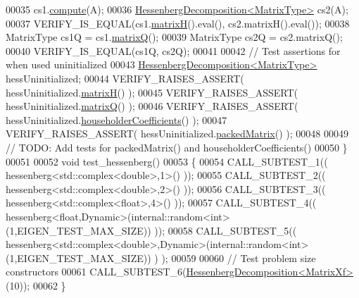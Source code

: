 \begin{DoxyCode}
00035   cs1.\hyperlink{group___eigenvalues___module_a239a6fd42c57aab3c0b048c47fde3004}{compute}(A);
00036   \hyperlink{group___eigenvalues___module}{HessenbergDecomposition<MatrixType>} cs2(A);
00037   VERIFY\_IS\_EQUAL(cs1.\hyperlink{group___eigenvalues___module_a8e781d2e22a2304647bcf0ae913cc8ea}{matrixH}().eval(), cs2.matrixH().eval());
00038   MatrixType cs1Q = cs1.\hyperlink{group___eigenvalues___module_a346441e4902a58d43d698ac3da6ff791}{matrixQ}();
00039   MatrixType cs2Q = cs2.matrixQ();  
00040   VERIFY\_IS\_EQUAL(cs1Q, cs2Q);
00041 
00042   \textcolor{comment}{// Test assertions for when used uninitialized}
00043   \hyperlink{group___eigenvalues___module}{HessenbergDecomposition<MatrixType>} hessUninitialized;
00044   VERIFY\_RAISES\_ASSERT( hessUninitialized.\hyperlink{group___eigenvalues___module_a8e781d2e22a2304647bcf0ae913cc8ea}{matrixH}() );
00045   VERIFY\_RAISES\_ASSERT( hessUninitialized.\hyperlink{group___eigenvalues___module_a346441e4902a58d43d698ac3da6ff791}{matrixQ}() );
00046   VERIFY\_RAISES\_ASSERT( hessUninitialized.\hyperlink{group___eigenvalues___module_a65fa81ce79d956baa59a30a6d82f8a84}{householderCoefficients}() );
00047   VERIFY\_RAISES\_ASSERT( hessUninitialized.\hyperlink{group___eigenvalues___module_a1f72b7612fd4edc5a6f31005e433e1dd}{packedMatrix}() );
00048 
00049   \textcolor{comment}{// TODO: Add tests for packedMatrix() and householderCoefficients()}
00050 \}
00051 
00052 \textcolor{keywordtype}{void} test\_hessenberg()
00053 \{
00054   CALL\_SUBTEST\_1(( hessenberg<std::complex<double>,1>() ));
00055   CALL\_SUBTEST\_2(( hessenberg<std::complex<double>,2>() ));
00056   CALL\_SUBTEST\_3(( hessenberg<std::complex<float>,4>() ));
00057   CALL\_SUBTEST\_4(( hessenberg<float,Dynamic>(internal::random<int>(1,EIGEN\_TEST\_MAX\_SIZE)) ));
00058   CALL\_SUBTEST\_5(( hessenberg<std::complex<double>,Dynamic>(internal::random<int>(1,EIGEN\_TEST\_MAX\_SIZE)) )
      );
00059 
00060   \textcolor{comment}{// Test problem size constructors}
00061   CALL\_SUBTEST\_6(\hyperlink{group___eigenvalues___module_class_eigen_1_1_hessenberg_decomposition}{HessenbergDecomposition<MatrixXf>}(10));
00062 \}
\end{DoxyCode}

